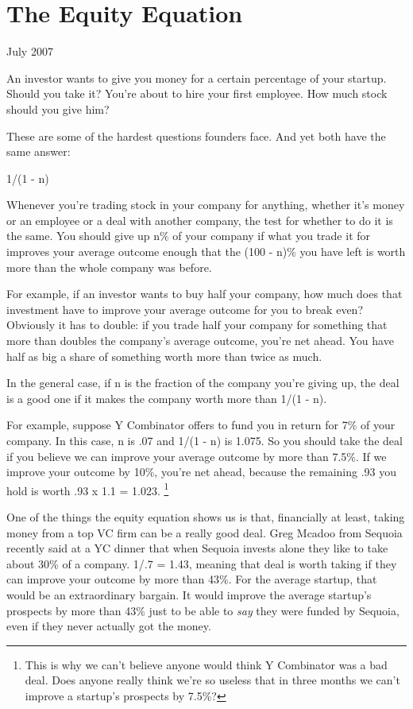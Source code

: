 \chapter{The Equity Equation}

July 2007

An investor wants to give you money for a certain percentage of your
startup. Should you take it? You're about to hire your first employee.
How much stock should you give him?

These are some of the hardest questions founders face. And yet both have
the same answer:

1/(1 - n)

Whenever you're trading stock in your company for anything, whether it's
money or an employee or a deal with another company, the test for
whether to do it is the same. You should give up n\% of your company if
what you trade it for improves your average outcome enough that the (100
- n)\% you have left is worth more than the whole company was before.

For example, if an investor wants to buy half your company, how much
does that investment have to improve your average outcome for you to
break even? Obviously it has to double: if you trade half your company
for something that more than doubles the company's average outcome,
you're net ahead. You have half as big a share of something worth more
than twice as much.

In the general case, if n is the fraction of the company you're giving
up, the deal is a good one if it makes the company worth more than 1/(1
- n).

For example, suppose Y Combinator offers to fund you in return for 7\%
of your company. In this case, n is .07 and 1/(1 - n) is 1.075. So you
should take the deal if you believe we can improve your average outcome
by more than 7.5\%. If we improve your outcome by 10\%, you're net
ahead, because the remaining .93 you hold is worth .93 x 1.1 = 1.023.
\footnote{This is why we can't believe anyone would think Y Combinator was
a bad deal. Does anyone really think we're so useless that in three
months we can't improve a startup's prospects by 7.5\%?}

One of the things the equity equation shows us is that, financially at
least, taking money from a top VC firm can be a really good deal. Greg
Mcadoo from Sequoia recently said at a YC dinner that when Sequoia
invests alone they like to take about 30\% of a company. 1/.7 = 1.43,
meaning that deal is worth taking if they can improve your outcome by
more than 43\%. For the average startup, that would be an extraordinary
bargain. It would improve the average startup's prospects by more than
43\% just to be able to \emph{say} they were funded by Sequoia, even if
they never actually got the money.

